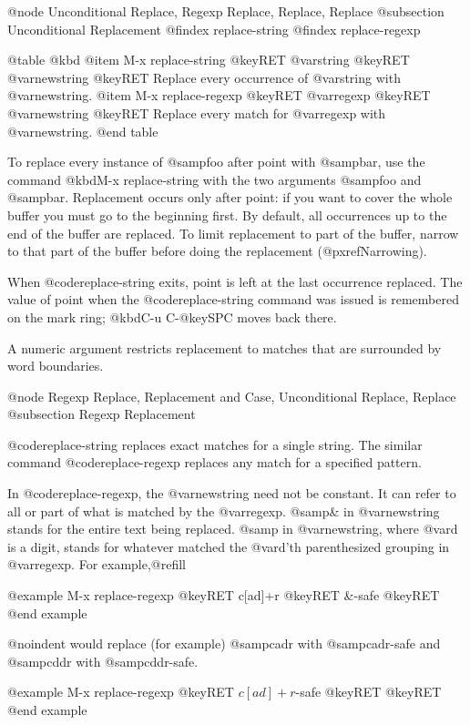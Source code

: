 {{{{{{{{{{{{{{@node Unconditional Replace, Regexp Replace, Replace, Replace
@subsection Unconditional Replacement
@findex replace-string
@findex replace-regexp

@table @kbd
@item M-x replace-string @key{RET} @var{string} @key{RET} @var{newstring} @key{RET}
Replace every occurrence of @var{string} with @var{newstring}.
@item M-x replace-regexp @key{RET} @var{regexp} @key{RET} @var{newstring} @key{RET}
Replace every match for @var{regexp} with @var{newstring}.
@end table

  To replace every instance of @samp{foo} after point with @samp{bar},
use the command @kbd{M-x replace-string} with the two arguments
@samp{foo} and @samp{bar}.  Replacement occurs only after point: if you
want to cover the whole buffer you must go to the beginning first.  By
default, all occurrences up to the end of the buffer are replaced.  To
limit replacement to part of the buffer, narrow to that part of the
buffer before doing the replacement (@pxref{Narrowing}).

  When @code{replace-string} exits, point is left at the last occurrence
replaced.  The value of point when the @code{replace-string} command was
issued is remembered on the mark ring; @kbd{C-u C-@key{SPC}} moves back
there.

  A numeric argument restricts replacement to matches that are surrounded
by word boundaries.

@node Regexp Replace, Replacement and Case, Unconditional Replace, Replace
@subsection Regexp Replacement

  @code{replace-string} replaces exact matches for a single string.  The
similar command @code{replace-regexp} replaces any match for a specified
pattern.

  In @code{replace-regexp}, the @var{newstring} need not be constant.  It
can refer to all or part of what is matched by the @var{regexp}.  @samp{\&}
in @var{newstring} stands for the entire text being replaced.
@samp{} in @var{newstring}, where @var{d} is a digit, stands for
whatever matched the @var{d}'th parenthesized grouping in @var{regexp}.
For example,@refill

@example
M-x replace-regexp @key{RET} c[ad]+r @key{RET} \&-safe @key{RET}
@end example

@noindent
would replace (for example) @samp{cadr} with @samp{cadr-safe} and @samp{cddr}
with @samp{cddr-safe}.

@example
M-x replace-regexp @key{RET} \(c[ad]+r\)-safe @key{RET} \1 @key{RET}
@end example

}}}}}}}}}}}}}}
